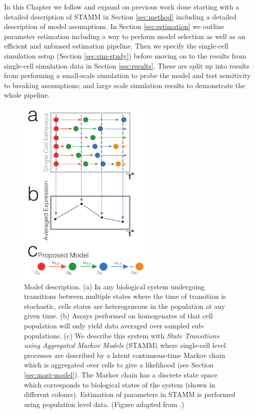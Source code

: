 In this Chapter we follow and expand on previous work done starting with a detailed description of STAMM in Section \ref{sec:method} including a detailed description of model assumptions. In Section \ref{sec:estimation} we outline parameter estimation including a way to perform model selection as well as an efficient and unbiased estimation pipeline. Then we specify the single-cell simulation setup (Section \ref{sec:sim-study})  before moving on to the results from single-cell simulation data in Section \ref{sec:results}. These are split up into results from performing a small-scale simulation to probe the model and test sensitivity to breaking assumptions; and large scale simulation results to demonstrate the whole pipeline.

\begin{figure}[!t]
  \centering
  \includegraphics[width=0.6\textwidth]{pics/model_fig.pdf}
  \caption{Model description. (a) In any biological system undergoing transitions between multiple states where the time of transition is stochastic, cells states are heterogeneous in the population at any given time.  (b) Assays performed on homogenates of that cell population will only yield data averaged over sampled sub-populations. (c) We describe this system with \emph{State Transitions using Aggregated Markov Models} (STAMM) where single-cell level processes are described by a latent continuous-time Markov chain which is aggregated over cells to give a likelihood (see Section \ref{sec:mast-model}). The Markov chain has a discrete state space which corresponds to biological states of the system (shown in different colours). Estimation of parameters in STAMM is performed using population level data. (Figure adapted from \cite{Armond:2013}.)  }
  \label{fig:model-sketch}
\end{figure}


